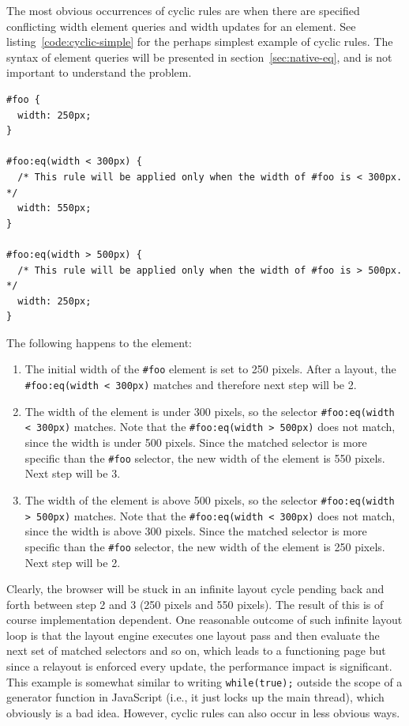 \documentclass[a4paper,11pt]{kth-mag}
\newcommand{\code}[1]{\texttt{#1}}
\begin{document}
          The most obvious occurrences of cyclic rules are when there are specified conflicting width element queries and width updates for an \gls{element}.
          See listing~\ref{code:cyclic-simple} for the perhaps simplest example of cyclic rules.
          The syntax of element queries will be presented in section~\ref{sec:native-eq}, and is not important to understand the problem.
          \begin{lstlisting}[caption={Simple example of cyclic rules with directly conflicting width element queries and updates.}, captionpos=b, label={code:cyclic-simple}]
#foo {
  width: 250px;
}

#foo:eq(width < 300px) {
  /* This rule will be applied only when the width of #foo is < 300px. */
  width: 550px;
}

#foo:eq(width > 500px) {
  /* This rule will be applied only when the width of #foo is > 500px. */
  width: 250px;
}
          \end{lstlisting}

          The following happens to the \gls{element}:
          \begin{enumerate}
          \item The initial width of the \code{\#foo} \gls{element} is set to 250 pixels.
          After a layout, the \code{\#foo:eq(width < 300px)} matches and therefore next step will be 2.
          \item The width of the \gls{element} is under 300 pixels, so the selector \code{\#foo:eq(width < 300px)} matches.
          Note that the \code{\#foo:eq(width > 500px)} does not match, since the width is under 500 pixels.
          Since the matched selector is more specific than the \code{\#foo} selector, the new width of the \gls{element} is 550 pixels.
          Next step will be 3.
          \item The width of the \gls{element} is above 500 pixels, so the selector \code{\#foo:eq(width > 500px)} matches.
          Note that the \code{\#foo:eq(width < 300px)} does not match, since the width is above 300 pixels.
          Since the matched selector is more specific than the \code{\#foo} selector, the new width of the \gls{element} is 250 pixels.
          Next step will be 2.
          \end{enumerate}
          Clearly, the \gls{browser} will be stuck in an infinite layout cycle pending back and forth between step 2 and 3 (250 pixels and 550 pixels).
          The result of this is of course implementation dependent.
          One reasonable outcome of such infinite layout loop is that the \gls{layout engine} executes one layout pass and then evaluate the next set of matched selectors and so on, which leads to a functioning page but since a relayout is enforced every update, the performance impact is significant.
          This example is somewhat similar to writing \code{while(true);} outside the scope of a generator function in JavaScript (i.e., it just locks up the main thread), which obviously is a bad idea.
          However, cyclic rules can also occur in less obvious ways. 
\end{document}
